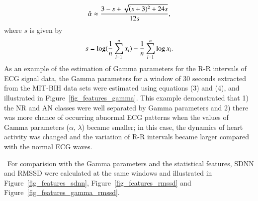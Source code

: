 \documentclass[times,twocolumn,final,authoryear]{elsarticle}
\begin{document}
\begin{equation}
\hat{\alpha}\approx{{3-s+\sqrt{(s+3)^2+24s}}\over{12s}}, \label{alpha}
\end{equation}
where $s$ is given by
\[
s = \log({1\over n}\sum_{i=1}^nx_i) - {1\over n}\sum_{i=1}^n\log x_i.
\]
As an example of the estimation of Gamma parameters for the R-R intervals of ECG signal data, the Gamma parameters for a window of 30 seconds 
extracted from the MIT-BIH data sets were estimated using equations (3) and (4), and illustrated in Figure~\ref{fig_features_gamma}. 
This example demonstrated that 1) the NR and AN classes were well separated by Gamma parameters and 
2) there was more chance of occurring abnormal ECG patterns when the values of Gamma parameters ($\alpha$, $\lambda$) became smaller;
in this case, the dynamics of heart activity was changed and the variation of R-R intervals became larger compared with the normal ECG waves.

\
For comparision with the Gamma parameters and the statistical features, SDNN and RMSSD were calculated at the same windows and illustrated in Figure~\ref{fig_features_sdnn}, Figure~\ref{fig_features_rmssd} and Figure~\ref{fig_features_gamma_rmssd}.
\vspace{1em}
\end{document}
